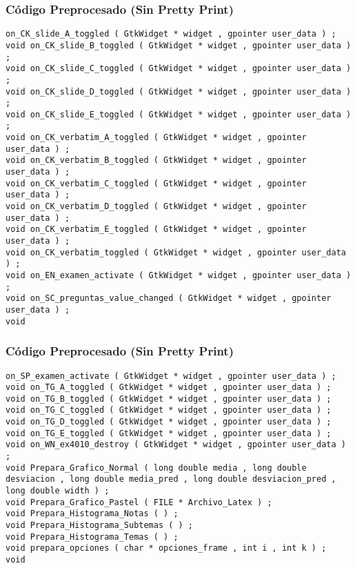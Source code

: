 \documentclass{beamer}
\begin{document}
\begin{frame}[fragile]
\frametitle{C\'odigo Preprocesado (Sin Pretty Print)}
\begin{lstlisting}[style=CStyle]
on_CK_slide_A_toggled ( GtkWidget * widget , gpointer user_data ) ; 
void on_CK_slide_B_toggled ( GtkWidget * widget , gpointer user_data ) ; 
void on_CK_slide_C_toggled ( GtkWidget * widget , gpointer user_data ) ; 
void on_CK_slide_D_toggled ( GtkWidget * widget , gpointer user_data ) ; 
void on_CK_slide_E_toggled ( GtkWidget * widget , gpointer user_data ) ; 
void on_CK_verbatim_A_toggled ( GtkWidget * widget , gpointer user_data ) ; 
void on_CK_verbatim_B_toggled ( GtkWidget * widget , gpointer user_data ) ; 
void on_CK_verbatim_C_toggled ( GtkWidget * widget , gpointer user_data ) ; 
void on_CK_verbatim_D_toggled ( GtkWidget * widget , gpointer user_data ) ; 
void on_CK_verbatim_E_toggled ( GtkWidget * widget , gpointer user_data ) ; 
void on_CK_verbatim_toggled ( GtkWidget * widget , gpointer user_data ) ; 
void on_EN_examen_activate ( GtkWidget * widget , gpointer user_data ) ; 
void on_SC_preguntas_value_changed ( GtkWidget * widget , gpointer user_data ) ; 
void \end{lstlisting}
\end{frame}
\begin{frame}[fragile]
\frametitle{C\'odigo Preprocesado (Sin Pretty Print)}
\begin{lstlisting}[style=CStyle]
on_SP_examen_activate ( GtkWidget * widget , gpointer user_data ) ; 
void on_TG_A_toggled ( GtkWidget * widget , gpointer user_data ) ; 
void on_TG_B_toggled ( GtkWidget * widget , gpointer user_data ) ; 
void on_TG_C_toggled ( GtkWidget * widget , gpointer user_data ) ; 
void on_TG_D_toggled ( GtkWidget * widget , gpointer user_data ) ; 
void on_TG_E_toggled ( GtkWidget * widget , gpointer user_data ) ; 
void on_WN_ex4010_destroy ( GtkWidget * widget , gpointer user_data ) ; 
void Prepara_Grafico_Normal ( long double media , long double desviacion , long double media_pred , long double desviacion_pred , long double width ) ; 
void Prepara_Grafico_Pastel ( FILE * Archivo_Latex ) ; 
void Prepara_Histograma_Notas ( ) ; 
void Prepara_Histograma_Subtemas ( ) ; 
void Prepara_Histograma_Temas ( ) ; 
void prepara_opciones ( char * opciones_frame , int i , int k ) ; 
void \end{lstlisting}
\end{frame}
\end{document}
